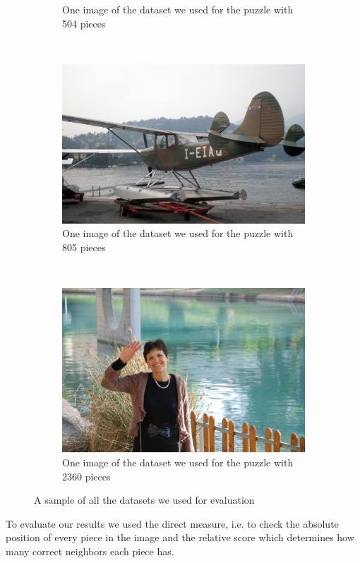 \documentclass[11pt]{report}
\begin{document}
\begin{figure}
\begin{subfigure}[b]{0.45\textwidth}
		\caption{One image of the dataset we used for the puzzle with 504 pieces}
		\label{img:540}
	\end{subfigure}
	~
	\begin{subfigure}[b]{0.45\textwidth}
		\includegraphics[width=\textwidth]{../imData/805/1.jpg}
		\caption{One image of the dataset we used for the puzzle with 805 pieces}
		\label{img:805}
	\end{subfigure}
	~
	\begin{subfigure}[b]{0.45\textwidth}
		\includegraphics[width=\textwidth]{../imData/2360/1.jpg}
		\caption{One image of the dataset we used for the puzzle with 2360 pieces}
		\label{img:2360}
	\end{subfigure}
	
	\caption{A sample of all the datasets we used for evaluation}
	\label{fig:database}
\end{figure}

To evaluate our results we used the direct measure, i.e. to check the absolute position of every piece in the image and the relative score which determines how many correct neighbors each piece has.



\end{document}
